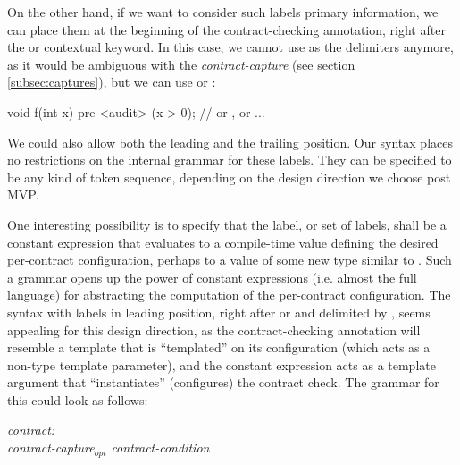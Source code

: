 On the other hand, if we want to consider such labels primary information, we can place them at the beginning of the contract-checking annotation, right after the  or  contextual keyword. In this case, we cannot use \mbox{\tcode{[...]}} as the delimiters anymore, as it would be ambiguous with the \emph{contract-capture} (see section \ref{subsec:captures}), but we can use \mbox{} or \mbox{}:

\vspace{2mm}
\begin{codeblock}
void f(int x)
  pre <audit> (x > 0);    // or , or \tcode{[\{audit\}]} ...
\end{codeblock}
\vspace{2mm}

We could also allow both the leading and the trailing position. Our syntax places no restrictions on the internal grammar for these labels. They can be specified to be any kind of token sequence, depending on the design direction we choose post MVP.

One interesting possibility is to specify that the label, or set of labels, shall be a constant expression that evaluates to a compile-time value defining the desired per-contract configuration, perhaps to a value of some new type  similar to . Such a grammar opens up the power of constant expressions (i.e. almost the full language) for abstracting the computation of the per-contract configuration. The syntax with labels in leading position, right after  or  and delimited by \mbox{}, seems appealing for this design direction, as the contract-checking annotation will resemble a template that is ``templated'' on its configuration (which acts as a non-type template parameter), and the constant expression acts as a template argument that ``instantiates'' (configures) the contract check. The grammar for this could look as follows:

\begin{adjustwidth}{0.5cm}{0.5cm}

\emph{contract:} \\
\phantom{~~~} \emph{contract-capture}$_{opt}$ \emph{contract-condition}

 \\
\phantom{~~~}

\end{adjustwidth}

